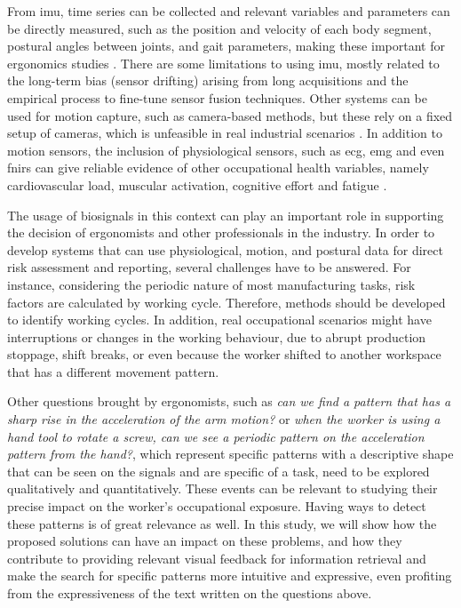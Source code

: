 From \gls{imu}, time series can be collected and relevant variables and parameters can be directly measured, such as the position and velocity of each body segment, postural angles between joints, and gait parameters, making these important for ergonomics studies \cite{Caputo2019, Hang19}. There are some limitations to using \gls{imu}, mostly related to the long-term bias (sensor drifting) arising from long acquisitions and the empirical process to fine-tune sensor fusion techniques. Other systems can be used for motion capture, such as camera-based methods, but these rely on a fixed setup of cameras, which is unfeasible in real industrial scenarios \cite{sara}. In addition to motion sensors, the inclusion of physiological sensors, such as \gls{ecg}, \gls{emg} and even \gls{fnirs} can give reliable evidence of other occupational health variables, namely cardiovascular load, muscular activation, cognitive effort and fatigue \cite{silva_rip, cardiovascular_load, rythm_cyclic_work, rui_varandas}.

The usage of biosignals in this context can play an important role in supporting the decision of ergonomists and other professionals in the industry. In order to develop systems that can use physiological, motion, and postural data for direct risk assessment and reporting, several challenges have to be answered. For instance, considering the periodic nature of most manufacturing tasks, risk factors are calculated by working cycle. Therefore, methods should be developed to identify working cycles. In addition, real occupational scenarios might have interruptions or changes in the working behaviour, due to abrupt production stoppage, shift breaks, or even because the worker shifted to another workspace that has a different movement pattern. 

Other questions brought by ergonomists, such as \textit{can we find a pattern that has a sharp rise in the acceleration of the arm motion?} or \textit{when the worker is using a hand tool to rotate a screw, can we see a periodic pattern on the acceleration pattern from the hand?}, which represent specific patterns with a descriptive shape that can be seen on the signals and are specific of a task, need to be explored qualitatively and quantitatively. These events can be relevant to studying their precise impact on the worker's occupational exposure. Having ways to detect these patterns is of great relevance as well. In this study, we will show how the proposed solutions can have an impact on these problems, and how they contribute to providing relevant visual feedback for information retrieval and make the search for specific patterns more intuitive and expressive, even profiting from the expressiveness of the text written on the questions above.

